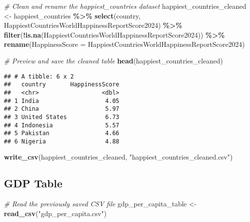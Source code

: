 \documentclass[
]{article}
\newenvironment{Shaded}{\begin{snugshade}}{\end{snugshade}}
\newcommand{\AttributeTok}[1]{\textcolor[rgb]{0.13,0.29,0.53}{#1}}
\newcommand{\CommentTok}[1]{\textcolor[rgb]{0.56,0.35,0.01}{\textit{#1}}}
\newcommand{\FunctionTok}[1]{\textcolor[rgb]{0.13,0.29,0.53}{\textbf{#1}}}
\newcommand{\NormalTok}[1]{#1}
\newcommand{\OtherTok}[1]{\textcolor[rgb]{0.56,0.35,0.01}{#1}}
\newcommand{\SpecialCharTok}[1]{\textcolor[rgb]{0.81,0.36,0.00}{\textbf{#1}}}
\newcommand{\StringTok}[1]{\textcolor[rgb]{0.31,0.60,0.02}{#1}}
\begin{document}
\begin{Shaded}
\begin{Highlighting}[]
\CommentTok{\# Clean and rename the happiest\_countries dataset}
\NormalTok{happiest\_countries\_cleaned }\OtherTok{\textless{}{-}}\NormalTok{ happiest\_countries }\SpecialCharTok{\%\textgreater{}\%}
  \FunctionTok{select}\NormalTok{(country, HappiestCountriesWorldHappinessReportScore2024) }\SpecialCharTok{\%\textgreater{}\%} 
  \FunctionTok{filter}\NormalTok{(}\SpecialCharTok{!}\FunctionTok{is.na}\NormalTok{(HappiestCountriesWorldHappinessReportScore2024)) }\SpecialCharTok{\%\textgreater{}\%} 
  \FunctionTok{rename}\NormalTok{(}\AttributeTok{HappinessScore =}\NormalTok{ HappiestCountriesWorldHappinessReportScore2024) }

\CommentTok{\# Preview and save the cleaned table}
\FunctionTok{head}\NormalTok{(happiest\_countries\_cleaned)}
\end{Highlighting}
\end{Shaded}

\begin{verbatim}
## # A tibble: 6 x 2
##   country       HappinessScore
##   <chr>                  <dbl>
## 1 India                   4.05
## 2 China                   5.97
## 3 United States           6.73
## 4 Indonesia               5.57
## 5 Pakistan                4.66
## 6 Nigeria                 4.88
\end{verbatim}

\begin{Shaded}
\begin{Highlighting}[]
\FunctionTok{write\_csv}\NormalTok{(happiest\_countries\_cleaned, }\StringTok{"happiest\_countries\_cleaned.csv"}\NormalTok{)}
\end{Highlighting}
\end{Shaded}

\subsection{GDP Table}\label{gdp-table}

\begin{Shaded}
\begin{Highlighting}[]
\CommentTok{\# Read the previously saved CSV file}
\NormalTok{gdp\_per\_capita\_table }\OtherTok{\textless{}{-}} \FunctionTok{read\_csv}\NormalTok{(}\StringTok{"gdp\_per\_capita.csv"}\NormalTok{)}
\end{Highlighting}
\end{Shaded}
\end{document}
